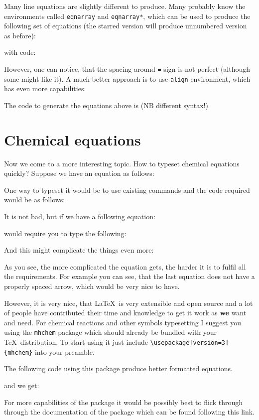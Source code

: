 \documentclass[
    draft
]{scrartcl}
\begin{document}
Many line equations are slightly different to produce. Many probably know the
environments called \verb|eqnarray| and \verb|eqnarray*|, which can be used to
produce the following set of equations (the starred version will produce
unnumbered version as before):

with code:


However, one can notice, that the spacing around \verb|=| sign is not perfect
(although some might like it). A much better approach is to use \verb|align|
environment, which has even more capabilities.

The code to generate the equations above is (NB different syntax!)


\section{Chemical equations}

Now we come to a more interesting topic. How to typeset chemical equations
quickly? Suppose we have an equation as follows:


One way to typeset it would be to use existing commands and the code required
would be as follows:


It is not bad, but if we have a following equation:

would require you to type the following:


And this might complicate the things even more:



As you see, the more complicated the equation gets, the harder it is to fulfil
all the requirements. For example you can see, that the last equation does not
have a properly spaced arrow, which would be very nice to have.

However, it is very nice, that \LaTeX\ is very extensible and open source and
a lot of people have contributed their time and knowledge to get it work as
\textbf{we} want and need. For chemical reactions and other symbols typesetting
I suggest you using the \verb|mhchem| package which should already be bundled with your
\TeX\ distribution. To start using it just include
\verb|\usepackage[version=3]{mhchem}| into your preamble.

The following code using this package produce better formatted equations.

and we get:


For more capabilities of the package it would be possibly best to flick through
through the documentation of the package which can be found following this link.
\end{document}
